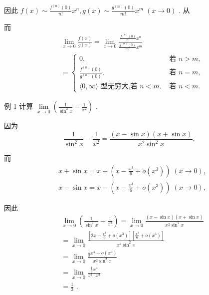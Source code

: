 因此 $f\left( x\right)  \sim  \frac{{f}^{\left( n\right) }\left( 0\right) }{n!}{x}^{n},g\left( x\right)  \sim  \frac{{g}^{\left( m\right) }\left( 0\right) }{m!}{x}^{m}\;\left( {x \rightarrow  0}\right)$ . 从

而
\begin{align*}
	&\mathop{\lim }\limits_{{x \rightarrow  0}}\frac{f\left( x\right) }{g\left( x\right) } = \mathop{\lim }\limits_{{x \rightarrow  0}}\frac{\frac{{f}^{\left( n\right) }\left( 0\right) }{n!}{x}^{n}}{\frac{{g}^{\left( m\right) }\left( 0\right) }{m!}{x}^{m}}\\
	&= \left\{  \begin{array}{ll} 0, & \text{ 若 }n > m, \\  \frac{{f}^{\left( n\right) }\left( 0\right) }{{g}^{\left( n\right) }\left( 0\right) }, & \text{ 若 }n = m, \\  \langle 0,\infty \rangle \text{ 型无穷大,若 }n < m. & \text{ 若 }n < m. \end{array}\right.
\end{align*}

例 1 计算 $\mathop{\lim }\limits_{{x \rightarrow  0}}\left( {\frac{1}{{\sin }^{2}x} - \frac{1}{{x}^{2}}}\right)$ .

因为
$$\frac{1}{{\sin }^{2}x} - \frac{1}{{x}^{2}} = \frac{\left( {x - \sin x}\right) \left( {x + \sin x}\right) }{{x}^{2}{\sin }^{2}x},$$

而
\begin{align*}
	&x + \sin x = x + \left( {x - \frac{{x}^{3}}{6} + o\left( {x}^{3}\right) }\right) \;\left( {x \rightarrow  0}\right) ,\\
	&x - \sin x = x - \left( {x - \frac{{x}^{3}}{6} + o\left( {x}^{3}\right) }\right) \;\left( {x \rightarrow  0}\right) ,
\end{align*}

因此
\begin{align*}
	&\mathop{\lim }\limits_{{x \rightarrow  0}}\left( {\frac{1}{{\sin }^{2}x} - \frac{1}{{x}^{2}}}\right)  = \mathop{\lim }\limits_{{x \rightarrow  0}}\frac{\left( {x - \sin x}\right) \left( {x + \sin x}\right) }{{x}^{2}{\sin }^{2}x}\\
	&= \mathop{\lim }\limits_{{x \rightarrow  0}}\frac{\left\lbrack  {{2x} - \frac{{x}^{3}}{6} + o\left( {x}^{3}\right) }\right\rbrack  \left\lbrack  {\frac{{x}^{3}}{6} + o\left( {x}^{3}\right) }\right\rbrack  }{{x}^{2}{\sin }^{2}x}\\
	&= \mathop{\lim }\limits_{{x \rightarrow  0}}\frac{\frac{1}{3}{x}^{4} + o\left( {x}^{4}\right) }{{x}^{2}{\sin }^{2}x}\\
	&= \mathop{\lim }\limits_{{x \rightarrow  0}}\frac{\frac{1}{3}{x}^{4}}{{x}^{2} \cdot  {x}^{2}}\\
	&= \frac{1}{3}\text{ . }
\end{align*}

